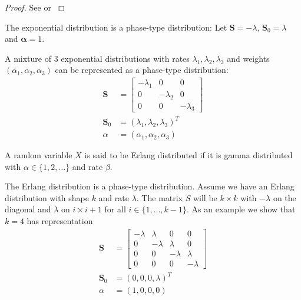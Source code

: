 \begin{proof}
See \cite{neuts1981} or \cite{mle_phase_type2011}
\end{proof}

\begin{example}
The exponential distribution is a phase-type distribution:
Let $\mathbf S = - \lambda$, $\mathbf{S}_0 = \lambda$ and $\boldsymbol{\alpha} = 1$.
\end{example}

\begin{example}
A mixture of 3 exponential distributions with rates $\lambda_1, \lambda_2, \lambda_3$ and weights $(\alpha_1, \alpha_2, \alpha_3)$ can be represented as a phase-type distribution:
\begin{align*}
    \mathbf S &= \begin{bmatrix}
        -\lambda_1 & 0 & 0\\
        0 & - \lambda_2 & 0\\
        0 & 0 & - \lambda_3
        \end{bmatrix}\\
    \mathbf{S}_0 &= (\lambda_1, \lambda_2, \lambda_3)^T\\
    \alpha &= (\alpha_1, \alpha_2, \alpha_3)
\end{align*}
\end{example}

\begin{defn} \label{defn:erlang}
A random variable $X$ is said to be Erlang distributed if it is gamma distributed with $\alpha \in \{1,2,\ldots\}$ and rate $\beta$.
\end{defn}

\begin{example}
The Erlang distribution is a phase-type distribution.
Assume we have an Erlang distribution with shape $k$ and rate $\lambda$.
The matrix $S$ will be $k \times k$ with $-\lambda$ on the diagonal and $\lambda$ on $i \times i + 1$ for all $i \in \{1, \ldots, k - 1\}$.
As an example we show that $k = 4$ has representation
\begin{align*}
    \mathbf S &= \begin{bmatrix}
        -\lambda & \lambda & 0 & 0\\
        0 & - \lambda & \lambda & 0\\
        0 & 0 & -\lambda & \lambda\\
        0 & 0 & 0 & -\lambda
        \end{bmatrix}\\
    \mathbf{S}_0 &= (0, 0, 0, \lambda)^T\\
    \alpha &= (1,0,0,0)
\end{align*}
\end{example}

